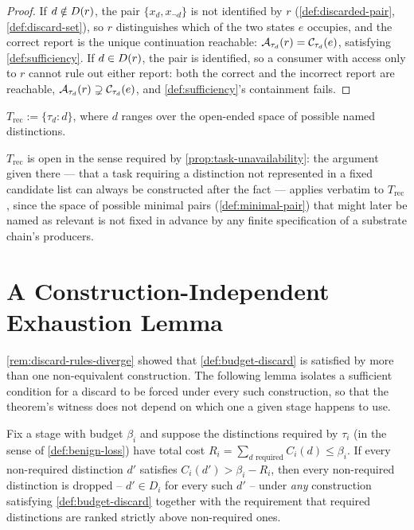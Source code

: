 \begin{proof}
If $d \notin D(r)$, the pair $\{x_d, x_{\neg d}\}$ is not
identified by $r$ (\cref{def:discarded-pair}, \cref{def:discard-set}), so
$r$ distinguishes which of the two states $e$ occupies, and the correct
report is the unique continuation reachable: $\mathcal{A}_{\tau_d}(r) =
\mathcal{C}_{\tau_d}(e)$, satisfying \cref{def:sufficiency}. If $d \in
D(r)$, the pair is identified, so a consumer with access only to
$r$ cannot rule out either report: both the correct and the incorrect
report are reachable, $\mathcal{A}_{\tau_d}(r) \supsetneq \mathcal{C}_{\tau_d}(e)$,
and \cref{def:sufficiency}'s containment fails.
\end{proof}

\begin{definition}
\label{def:witnessing-family}
$T_{\mathrm{rec}} := \{\tau_d : d\}$, where $d$ ranges over the
open-ended space of possible named distinctions.
\end{definition}

$T_{\mathrm{rec}}$ is open in the sense required by
\cref{prop:task-unavailability}: the argument given there --- that a task
requiring a distinction not represented in a fixed candidate list can
always be constructed after the fact --- applies verbatim to
$T_{\mathrm{rec}}$, since the space of possible minimal pairs
(\cref{def:minimal-pair}) that might later be named as relevant is not
fixed in advance by any finite specification of a substrate chain's
producers.

\section{A Construction-Independent Exhaustion Lemma}

\cref{rem:discard-rules-diverge} showed that \cref{def:budget-discard} is
satisfied by more than one non-equivalent construction. The following
lemma isolates a sufficient condition for a discard to be forced under
every such construction, so that the theorem's witness does not depend on
which one a given stage happens to use.

\begin{lemma}
\label{lem:exhaustion}
Fix a stage with budget $\beta_i$ and suppose the distinctions required by
$\tau_i$ (in the sense of \cref{def:benign-loss}) have total cost
$R_i = \sum_{d \text{ required}} C_i(d) \le \beta_i$. If every
non-required distinction $d'$ satisfies $C_i(d') > \beta_i - R_i$, then
every non-required distinction is dropped -- $d' \in D_i$ for every such
$d'$ -- under \emph{any} construction satisfying \cref{def:budget-discard}
together with the requirement that required distinctions are ranked
strictly above non-required ones.
\end{lemma}

